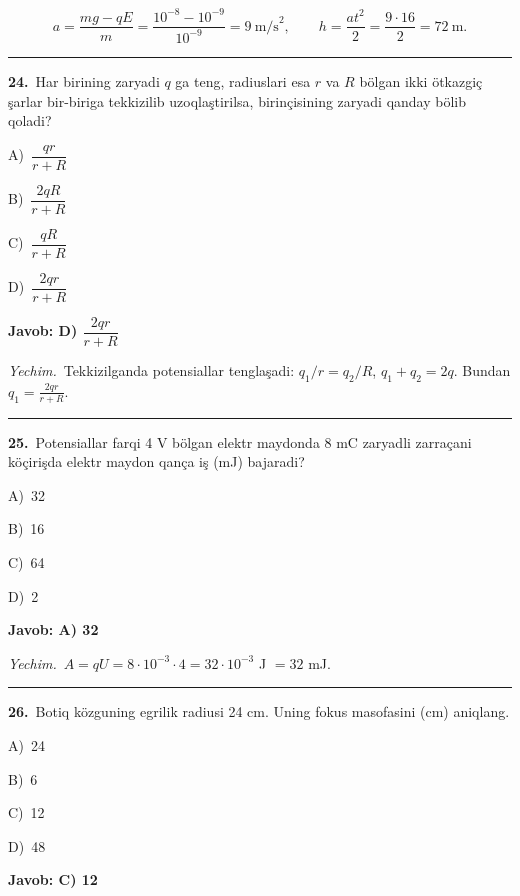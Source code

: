 \documentclass[11pt,a4paper]{article}
\newcommand{\opt}[2]{\hspace*{4mm}#1)\ #2\par}
\begin{document}
\[a=\frac{mg-qE}{m}=\frac{10^{-8}-10^{-9}}{10^{-9}}=9\ \text{m/s}^2,\qquad h=\frac{at^2}{2}=\frac{9\cdot16}{2}=72\ \text{m}.\]\par\medskip\hrule\medskip
{}\noindent\begin{minipage}{\linewidth}
\textbf{24.}\ Har birining zaryadi $q$ ga teng, radiuslari esa $r$ va $R$ bölgan ikki ötkazgiç şarlar bir-biriga tekkizilib uzoqlaştirilsa, birinçisining zaryadi qanday bölib qoladi?\par\smallskip
\opt{A}{$\dfrac{qr}{r+R}$}
\opt{B}{$\dfrac{2qR}{r+R}$}
\opt{C}{$\dfrac{qR}{r+R}$}
\opt{D}{$\dfrac{2qr}{r+R}$}
\end{minipage}\vspace{2pt}\par
\noindent\colorbox{gray!12}{\parbox{\dimexpr\linewidth-2\fboxsep}{\textbf{Javob: D) $\dfrac{2qr}{r+R}$}}}\par\smallskip
\noindent\textit{Yechim.}\ Tekkizilganda potensiallar tenglaşadi: $q_1/r=q_2/R$, $q_1+q_2=2q$. Bundan $q_1=\frac{2qr}{r+R}$.\par\par\medskip\hrule\medskip
{}\noindent\begin{minipage}{\linewidth}
\textbf{25.}\ Potensiallar farqi 4 V bölgan elektr maydonda 8 mC zaryadli zarraçani köçirişda elektr maydon qança iş (mJ) bajaradi?\par\smallskip
\opt{A}{32}
\opt{B}{16}
\opt{C}{64}
\opt{D}{2}
\end{minipage}\vspace{2pt}\par
\noindent\colorbox{gray!12}{\parbox{\dimexpr\linewidth-2\fboxsep}{\textbf{Javob: A) 32}}}\par\smallskip
\noindent\textit{Yechim.}\ $A=qU=8\cdot10^{-3}\cdot4=32\cdot10^{-3}$ J $=32$ mJ.\par\par\medskip\hrule\medskip
{}\noindent\begin{minipage}{\linewidth}
\textbf{26.}\ Botiq közguning egrilik radiusi 24 cm. Uning fokus masofasini (cm) aniqlang.\par\smallskip
\opt{A}{24}
\opt{B}{6}
\opt{C}{12}
\opt{D}{48}
\end{minipage}\vspace{2pt}\par
\noindent\colorbox{gray!12}{\parbox{\dimexpr\linewidth-2\fboxsep}{\textbf{Javob: C) 12}}}\par\smallskip
\end{document}
